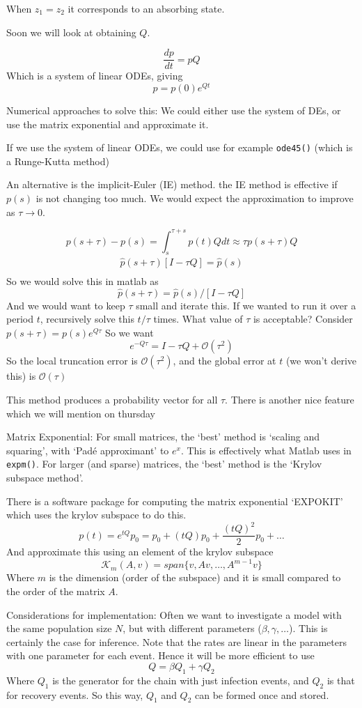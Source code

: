 \documentclass{X:/Documents/Coding/Latex/myassignment}
\begin{document}
When $z_1 = z_2$ it corresponds to an absorbing state.


Soon we will look at obtaining $Q$.

\[\frac{dp}{dt} = pQ\]
Which is a system of linear ODEs, giving
\[p = p(0) e^{Qt} \]

Numerical approaches to solve this: We could either use the system of DEs, or use the matrix exponential and approximate it.

If we use the system of linear ODEs, we could use for example \verb|ode45()| (which is a Runge-Kutta method)

An alternative is the implicit-Euler (IE) method. 
the IE method is effective if $p(s)$ is not changing too much. We would expect the approximation to improve as $\tau \to 0$.

\[p(s+\tau) - p(s) = \int_s^{\tau +s} p(t) Q dt \approx \tau p(s+\tau) Q\]
\begin{align*}
    \hat{p}(s+\tau)[I - \tau Q] = \hat{p}(s)\\
\end{align*}
So we would solve this in matlab as
\[\hat{p}(s+\tau) = \hat{p}(s)/[I - \tau Q] \]
And we would want to keep $\tau$ small and iterate this.
If we wanted to run it over a period $t$, recursively solve this $t/\tau$ times.
What value of $\tau$ is acceptable? Consider $p(s+\tau) = p(s) e^{Q\tau}$
So we want
\[e^{-Q\tau} = I-\tau Q + \mathcal{O}(\tau^2)\]
So the local truncation error is $\mathcal{O}(\tau^2)$, and the global error at $t$ (we won't derive this) is $\mathcal{O}(\tau)$


This method produces a probability vector for all $\tau$. 
There is another nice feature which we will mention on thursday


Matrix Exponential:
For small matrices, the `best' method is `scaling and squaring', with `Pad\'e approximant' to $e^x$. This is effectively what Matlab uses in \verb|expm()|. For larger (and sparse) matrices, the `best' method is the `Krylov subspace method'. 

There is a software package for computing the matrix exponential `EXPOKIT' which uses the krylov subspace to do this.
\[p(t) = e^{tQ}p_0 = p_0 + (tQ)p_0 + \frac{(tQ)^2}{2} p_0 +\hdots\]
And approximate this using an element of the krylov subspace
\[\mathcal{K}_m(A,v) = span\{v,Av,\hdots,A^{m-1}v\}\]
Where $m$ is the dimension (order of the subspace) and it is small compared to the order of the matrix $A$.



Considerations for implementation:
Often we want to investigate a model with the same population size $N$, but with different parameters ($\beta,\gamma,\hdots$). This is certainly the case for inference. Note that the rates are linear in the parameters with one parameter for each event.
Hence it will be more efficient to use
\[Q = \beta Q_1 + \gamma Q_2\]
Where $Q_1$ is the generator for the chain with just infection events, and $Q_2$ is that for recovery events. So this way, $Q_1$ and $Q_2$ can be formed once and stored.
\end{document}
